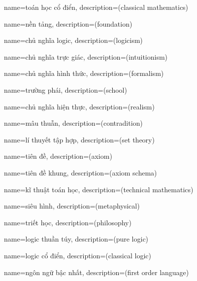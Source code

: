 


{
    name={toán học cổ điển},
    description={(classical mathematics)}
}

{
    name={nền tảng},
    description={(foundation)}
}

{
    name={chủ nghĩa logic},
    description={(logicism)}
}

{
    name={chủ nghĩa trực giác},
    description={(intuitionism)}
}

{
    name={chủ nghĩa hình thức},
    description={(formalism)}
}

{
    name={trường phái},
    description={(school)}
}

{
    name={chủ nghĩa hiện thực},
    description={(realism)}
}

{
    name={mâu thuẫn},
    description={(contradition)}
}

{
    name={lí thuyết tập hợp},
    description={(set theory)}
}

{
    name={tiên đề},
    description={(axiom)}
}

{
    name={tiên đề khung},
    description={(axiom schema)}
}

{
    name={kĩ thuật toán học},
    description={(technical mathematics)}
}

{
    name={siêu hình},
    description={(metaphysical)}
}

{
    name={triết học},
    description={(philosophy)}
}

{
    name={logic thuần túy},
    description={(pure logic)}
}

{
    name={logic cổ điển},
    description={(classical logic)}
}

{
    name={ngôn ngữ bậc nhất},
    description={(first order language)}
}

